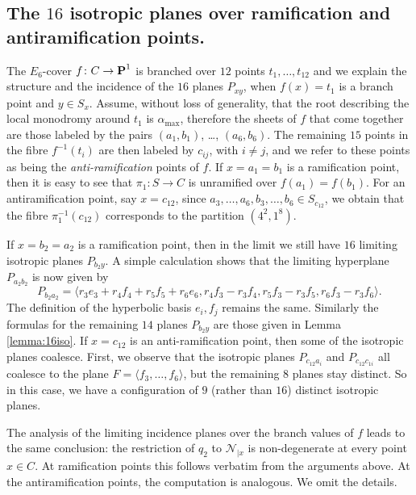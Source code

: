 \documentclass[11pt]{amsart}
\theoremstyle{definition}
\def\PP{{\textbf P}}
\begin{document}
\subsection{The $16$ isotropic planes over ramification and antiramification points.}\label{antiram}

The $E_6$-cover $f\colon C\rightarrow \PP^1$ is branched over $12$ points $t_1, \ldots, t_{12}$ and we explain the structure and the incidence of the $16$ planes $P_{xy}$, when $f(x)=t_1$ is a branch point and $y\in S_x$. Assume, without loss of generality, that the root describing the local monodromy around $t_1$ is $\alpha_{\max}$, therefore the sheets of $f$ that come together are those labeled by the pairs $(a_1, b_1)$, \ldots, $(a_6,b_6)$. The remaining $15$ points in the fibre $f^{-1}(t_i)$ are then labeled by $c_{ij}$, with $i\neq j$, and we refer to these points as being the \emph{anti-ramification} points of $f$. If $x=a_1=b_1$ is a ramification point, then it is easy to see that $\pi_1\colon S\rightarrow C$ is unramified over $f(a_1)=f(b_1)$. For an antiramification point, say $x=c_{12}$, since $a_3, \ldots, a_6, b_3, \ldots, b_6\in S_{c_{12}}$, we obtain that the fibre $\pi_1^{-1}(c_{12})$ corresponds to the partition $(4^2, 1^{8})$.

\vskip 4pt

If $x=b_2=a_2$ is a ramification point, then in the limit we still have $16$ limiting isotropic planes $P_{b_2 y}$. A simple calculation shows that the limiting hyperplane $P_{a_2b_2}$ is now given by 
$$P_{b_2a_2}=\bigl\langle r_3e_3+r_4 f_4+r_5f_5+r_6e_6,  r_4f_3-r_3f_4,  r_5f_3-r_3f_5,  r_6f_3-r_3f_6\bigr\rangle.$$
The definition of the hyperbolic basis $e_i, f_j$ remains the same. Similarly the formulas for the remaining $14$ planes $P_{b_2 y}$ are those given in Lemma \ref{lemma:16iso}. If $x=c_{12}$ is an anti-ramification point, then some of the isotropic planes coalesce. First, we observe that the isotropic planes $P_{c_{12} a_i}$ and $P_{c_{12} c_{1i}}$ all coalesce to the plane $F=\langle f_3, \ldots, f_6\rangle$, but the remaining $8$ planes stay distinct. So in this case, we have a configuration of $9$ (rather than $16$) distinct isotropic planes.


The analysis of the limiting incidence planes over the branch values of $f$ leads to the same conclusion: the restriction of $q_2$ to 
$\mathcal{N}_{|x}$ is non-degenerate at every point $x\in C$. At ramification points this follows verbatim from the arguments above. At the antiramification points, the computation is analogous. We omit the details.
\end{document}
